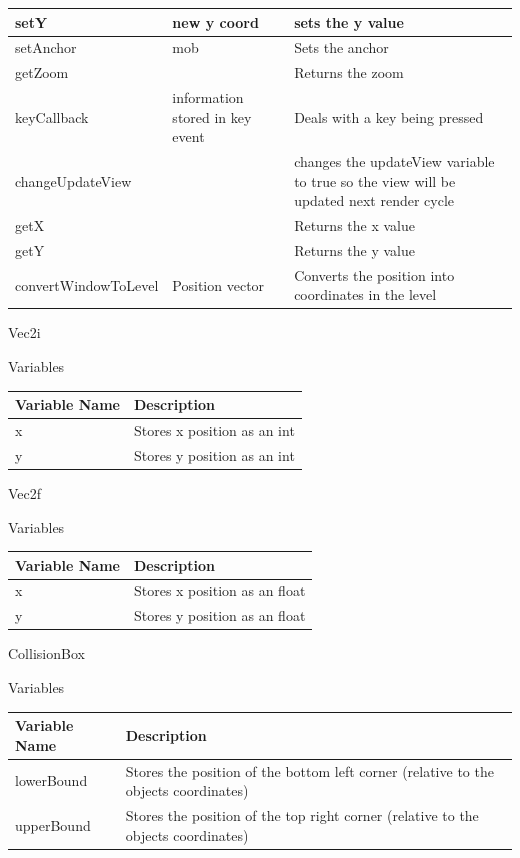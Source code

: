 \documentclass[../Design.tex]{subfiles}
\begin{document}
\begin{center}
\begin{tabular}{ | m{} | m{}| m{} | }
            \hline
            setY & new y coord & sets the y value \\
            \hline
            setAnchor & mob & Sets the anchor  \\
            \hline
            getZoom & & Returns the zoom \\
            \hline
            keyCallback & information stored in key event & Deals with a key being pressed \\
            \hline
            changeUpdateView & & changes the updateView variable to true so the view will be updated next render cycle \\
            \hline
            getX & & Returns the x value \\
            \hline
            getY & & Returns the y value \\
            \hline
            convertWindowToLevel & Position vector & Converts the position into coordinates in the level \\
            \hline
        \end{tabular}
    \end{center}
    Vec2i
    \begin{center}
        Variables
        \begin{tabular}{ | m{} | m{} | }
            \hline
            \textbf{Variable Name} & \textbf{Description} \\
            \hline
            x & Stores x position as an int \\
            \hline
            y & Stores y position as an int \\
            \hline
        \end{tabular}
    \end{center}
    Vec2f
    \begin{center}
        Variables
        \begin{tabular}{ | m{} | m{} | }
            \hline
            \textbf{Variable Name} & \textbf{Description} \\
            \hline
            x & Stores x position as an float \\
            \hline
            y & Stores y position as an float \\
            \hline
        \end{tabular}
    \end{center}
    CollisionBox
    \begin{center}
        Variables
        \begin{tabular}{ | m{} | m{} | }
            \hline
            \textbf{Variable Name} & \textbf{Description} \\
            \hline
            lowerBound & Stores the position of the bottom left corner (relative to the objects coordinates) \\
            \hline
            upperBound & Stores the position of the top right corner (relative to the objects coordinates) \\
            \hline
        \end{tabular}
    \end{center}
\end{document}
